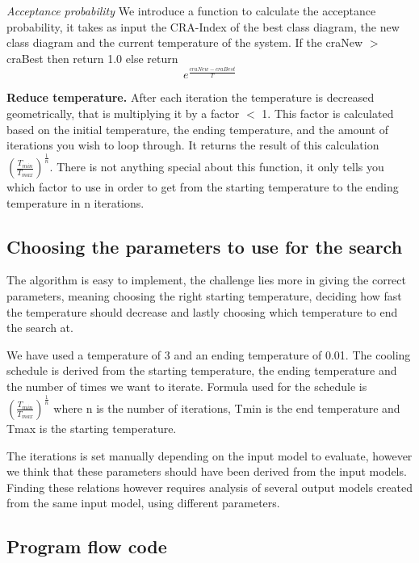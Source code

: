 \documentclass[a4paper]{article}
\begin{document}
\textit{Acceptance probability}
We introduce a function to calculate the acceptance probability, it takes as input the CRA-Index of the best class diagram, the new class diagram and the current temperature of the system.
If the craNew $>$ craBest then return 1.0 else return 
\[e^\frac{craNew - craBest}{T}\]

\textbf{Reduce temperature.}
After each iteration the temperature is decreased geometrically, that is multiplying it by a factor $<$ 1.
This factor is calculated based on the initial temperature, the ending temperature, and the amount of iterations you wish to loop through.
It returns the result of this calculation $(\frac{T_{min}}{T_{max}})^\frac{1}{n}$.
There is not anything special about this function, it only tells you which factor to use in order to get from the starting temperature to the ending temperature in n
iterations.

\subsection{Choosing the parameters to use for the search}

The algorithm is easy to implement, the challenge lies more in giving the correct parameters, meaning choosing the right starting temperature, deciding how fast the temperature should decrease and lastly choosing which temperature to end the search at.

We have used a temperature of 3 and an ending temperature of 0.01.
The cooling schedule is derived from the starting temperature, the ending temperature and the number of times we want to iterate.
Formula used for the schedule is $(\frac{T_{min}}{T_{max}})^\frac{1}{n}$ where n is the number of iterations, Tmin is the end temperature and Tmax is the starting temperature.

The iterations is set manually depending on the input model to evaluate, however we think that these parameters should have been derived from the input models.
Finding these relations however requires analysis of several output models created from the same input model, using different parameters.


\subsection{Program flow code}
\end{document}
